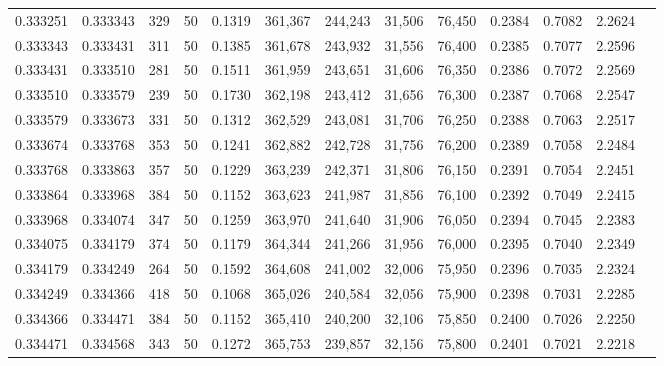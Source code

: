 \begin{tabular}{rrrrrrrrrrrrr}
0.333251 & 0.333343 &   329 &  50 &                                     0.1319 & 361,367 & 244,243 &  31,506 &  76,450 & 0.2384 & 0.7082 & 2.2624 \\
0.333343 & 0.333431 &   311 &  50 &                                     0.1385 & 361,678 & 243,932 &  31,556 &  76,400 & 0.2385 & 0.7077 & 2.2596 \\
0.333431 & 0.333510 &   281 &  50 &                                     0.1511 & 361,959 & 243,651 &  31,606 &  76,350 & 0.2386 & 0.7072 & 2.2569 \\
0.333510 & 0.333579 &   239 &  50 &                                     0.1730 & 362,198 & 243,412 &  31,656 &  76,300 & 0.2387 & 0.7068 & 2.2547 \\
0.333579 & 0.333673 &   331 &  50 &                                     0.1312 & 362,529 & 243,081 &  31,706 &  76,250 & 0.2388 & 0.7063 & 2.2517 \\
0.333674 & 0.333768 &   353 &  50 &                                     0.1241 & 362,882 & 242,728 &  31,756 &  76,200 & 0.2389 & 0.7058 & 2.2484 \\
0.333768 & 0.333863 &   357 &  50 &                                     0.1229 & 363,239 & 242,371 &  31,806 &  76,150 & 0.2391 & 0.7054 & 2.2451 \\
0.333864 & 0.333968 &   384 &  50 &                                     0.1152 & 363,623 & 241,987 &  31,856 &  76,100 & 0.2392 & 0.7049 & 2.2415 \\
0.333968 & 0.334074 &   347 &  50 &                                     0.1259 & 363,970 & 241,640 &  31,906 &  76,050 & 0.2394 & 0.7045 & 2.2383 \\
0.334075 & 0.334179 &   374 &  50 &                                     0.1179 & 364,344 & 241,266 &  31,956 &  76,000 & 0.2395 & 0.7040 & 2.2349 \\
0.334179 & 0.334249 &   264 &  50 &                                     0.1592 & 364,608 & 241,002 &  32,006 &  75,950 & 0.2396 & 0.7035 & 2.2324 \\
0.334249 & 0.334366 &   418 &  50 &                                     0.1068 & 365,026 & 240,584 &  32,056 &  75,900 & 0.2398 & 0.7031 & 2.2285 \\
0.334366 & 0.334471 &   384 &  50 &                                     0.1152 & 365,410 & 240,200 &  32,106 &  75,850 & 0.2400 & 0.7026 & 2.2250 \\
0.334471 & 0.334568 &   343 &  50 &                                     0.1272 & 365,753 & 239,857 &  32,156 &  75,800 & 0.2401 & 0.7021 & 2.2218 \\

\end{tabular}
